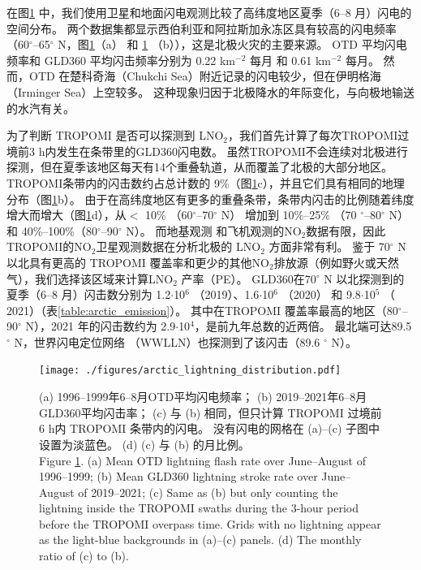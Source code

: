在图\ref{fig:arctic_lightning_distribution} 中，我们使用卫星和地面闪电观测比较了高纬度地区夏季（6--8 月）闪电的空间分布。
两个数据集都显示西伯利亚和阿拉斯加永冻区具有较高的闪电频率（60$^{\circ}$--65$^{\circ}$ N，图\ref{fig:arctic_lightning_distribution}（a） 和 \ref{fig:arctic_lightning_distribution} （b）），这是北极火灾的主要来源\citep{McCarty.2021}。
OTD 平均闪电频率和 GLD360 平均闪击频率分别为 0.22 km$^{-2}$ 每月 和 0.61 km$^{-2}$ 每月。
然而，OTD 在楚科奇海（Chukchi Sea）附近记录的闪电较少，但在伊明格海（Irminger Sea）上空较多。
这种现象归因于北极降水的年际变化，与向极地输送的水汽有关\citep{Bintanja.2020}。

为了判断 TROPOMI 是否可以探测到 LNO$_2$，我们首先计算了每次TROPOMI过境前3 h内发生在条带里的GLD360闪电数。
虽然TROPOMI不会连续对北极进行探测，但在夏季该地区每天有14个重叠轨道，从而覆盖了北极的大部分地区。
TROPOMI条带内的闪击数约占总计数的 9\%（图\ref{fig:arctic_lightning_distribution}c），并且它们具有相同的地理分布（图\ref{fig:arctic_lightning_distribution}b）。
由于在高纬度地区有更多的重叠条带，条带内闪击的比例随着纬度增大而增大（图\ref{fig:arctic_lightning_distribution}d），从$<$ 10\% （60$^{\circ}$--70$^{\circ}$ N） 增加到 10\%--25\% （70 $^{\circ}$--80$^{\circ}$ N） 和 40\%--100\%（80$^{\circ}$--90$^{\circ}$ N）。
而地基观测\citep{Schmale.2018} 和飞机观测\citep{Jacob.2010}的NO$_2$数据有限，因此TROPOMI的NO$_2$卫星观测数据在分析北极的 LNO$_2$ 方面非常有利。
鉴于 70$^{\circ}$ N 以北具有更高的 TROPOMI 覆盖率和更少的其他NO$_2$排放源（例如野火或天然气），我们选择该区域来计算LNO$_2$ 产率（PE）。
GLD360在70$^{\circ}$ N 以北探测到的夏季（6--8 月）闪击数分别为 1.2$\cdot$10$^6$ （2019）、1.6$\cdot$10$^6$ （2020） 和 9.8$\cdot$10$^5$ （ 2021）（表\ref{table:arctic_emission}）。
其中在TROPOMI 覆盖率最高的地区（80$^{\circ}$--90$^{\circ}$ N），2021 年的闪击数约为 2.9$\cdot$10$^4$，是前九年总数的近两倍\citep{networktotal.2021}。
最北端可达89.5$^{\circ}$ N，世界闪电定位网络 （WWLLN）也探测到了该闪击（89.6 $^{\circ}$ N）\citep{Holzworth.2021}。


\begin{figure}[htbp]
\centering
\texttt{[image: ./figures/arctic\_lightning\_distribution.pdf]}
\caption{
(a) 1996--1999年6--8月OTD平均闪电频率；
(b) 2019--2021年6--8月GLD360平均闪击率；
(c) 与 (b) 相同，但只计算 TROPOMI 过境前 6 h内 TROPOMI 条带内的闪电。
没有闪电的网格在 (a)--(c) 子图中设置为淡蓝色。
(d) (c) 与 (b) 的月比例。\\
Figure \ref{fig:arctic_lightning_distribution}.
(a) Mean OTD lightning flash rate over June--August of 1996--1999;
(b) Mean GLD360 lightning stroke rate over June--August of 2019--2021;
(c) Same as (b) but only counting the lightning inside the TROPOMI swaths during the 3-hour period before the TROPOMI overpass time.
Grids with no lightning appear as the light-blue backgrounds in (a)--(c) panels.
(d) The monthly ratio of (c) to (b).
}
\label{fig:arctic_lightning_distribution}
\end{figure}


